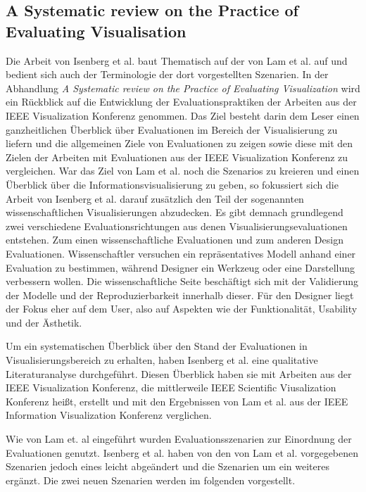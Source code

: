 \documentclass[draft=false
              ,paper=a4
              ,twoside=false
              ,fontsize=11pt
              ,headsepline
              ,BCOR10mm
              ,DIV11
              ]{scrbook}
\begin{document}
\subsection{A Systematic review on the Practice of Evaluating Visualisation} %
\label{sub:a_systematic_review_on_the_practice_of_evaluating_visualisation}
Die Arbeit von Isenberg et al. \cite{isenberg_systematic_2013} baut Thematisch auf der von Lam et al. auf \cite{lam_empirical_2012} und bedient sich auch der Terminologie der dort vorgestellten Szenarien. In der Abhandlung \textit{A Systematic review on the Practice of Evaluating Visualization} wird ein Rückblick auf die Entwicklung der Evaluationspraktiken der Arbeiten aus der IEEE Visualization Konferenz genommen. Das Ziel besteht darin dem Leser einen ganzheitlichen Überblick über Evaluationen im Bereich der Visualisierung zu liefern und die allgemeinen Ziele von Evaluationen zu zeigen sowie diese mit den Zielen der Arbeiten mit Evaluationen aus der IEEE Visualization Konferenz zu vergleichen. War das Ziel von Lam et al. noch die Szenarios zu kreieren und einen Überblick über die Informationsvisualisierung zu geben, so fokussiert sich die Arbeit von Isenberg et al. darauf zusätzlich den Teil der sogenannten wissenschaftlichen Visualisierungen abzudecken. Es gibt demnach grundlegend zwei verschiedene Evaluationsrichtungen aus denen Visualisierungsevaluationen entstehen. Zum einen wissenschaftliche Evaluationen und zum anderen Design Evaluationen. Wissenschaftler versuchen ein repräsentatives Modell anhand einer Evaluation zu bestimmen, während Designer ein Werkzeug oder eine Darstellung verbessern wollen. Die wissenschaftliche Seite beschäftigt sich mit der Validierung der Modelle und der Reproduzierbarkeit innerhalb dieser. Für den Designer liegt der Fokus eher auf dem User, also auf Aspekten wie der Funktionalität, Usability und der Ästhetik.

Um ein systematischen Überblick über den Stand der Evaluationen in Visualisierungsbereich zu erhalten, haben Isenberg et al. eine qualitative Literaturanalyse durchgeführt. Diesen Überblick haben sie mit Arbeiten aus der IEEE Visualization Konferenz, die mittlerweile IEEE Scientific Viusalization Konferenz heißt, erstellt und mit den Ergebnissen von Lam et al. aus der IEEE Information Visualization Konferenz verglichen. 

Wie von Lam et. al eingeführt wurden Evaluationsszenarien zur Einordnung der Evaluationen genutzt. Isenberg et al. haben von den von Lam et al. vorgegebenen Szenarien jedoch eines leicht abgeändert und die Szenarien um ein weiteres ergänzt. Die zwei neuen Szenarien werden im folgenden vorgestellt.
\end{document}
